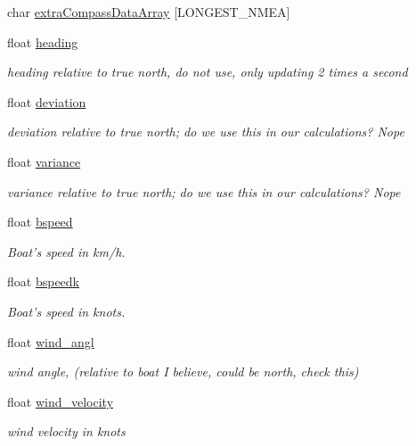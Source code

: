 \begin{DoxyCompactItemize}
char \hyperlink{group__group1_ga87dbc2b6143e295eae5c571f1b5f460d}{extra\-Compass\-Data\-Array} \mbox{[}\-L\-O\-N\-G\-E\-S\-T\-\_\-\-N\-M\-E\-A\mbox{]}
\item 
float \hyperlink{group__group1_gac5682e48513a771560df50e3b213e61a}{heading}
\begin{DoxyCompactList}\small\item\em heading relative to true north, do not use, only updating 2 times a second \end{DoxyCompactList}\item 
float \hyperlink{group__group1_gad20d9e23979c81b96a060830d0d460a6}{deviation}
\begin{DoxyCompactList}\small\item\em deviation relative to true north; do we use this in our calculations? \-Nope \end{DoxyCompactList}\item 
float \hyperlink{group__group1_gaec967762d2c44e3594070dca470ae334}{variance}
\begin{DoxyCompactList}\small\item\em variance relative to true north; do we use this in our calculations? \-Nope \end{DoxyCompactList}\item 
float \hyperlink{group__group1_ga3c5844d05a57a968ed5686a10e4a5af8}{bspeed}
\begin{DoxyCompactList}\small\item\em \-Boat's speed in km/h. \end{DoxyCompactList}\item 
float \hyperlink{group__group1_ga6ebc5b99dfacc747433709383f3bea8c}{bspeedk}
\begin{DoxyCompactList}\small\item\em \-Boat's speed in knots. \end{DoxyCompactList}\item 
float \hyperlink{group__group1_ga6bc5259b7cc1cb6128495b28f55b0a5d}{wind\-\_\-angl}
\begin{DoxyCompactList}\small\item\em wind angle, (relative to boat \-I believe, could be north, check this) \end{DoxyCompactList}\item 
float \hyperlink{group__group1_ga641fd5e4834deb5465b1931b7645457d}{wind\-\_\-velocity}
\begin{DoxyCompactList}\small\item\em wind velocity in knots \end{DoxyCompactList}\item 

\end{DoxyCompactItemize}
